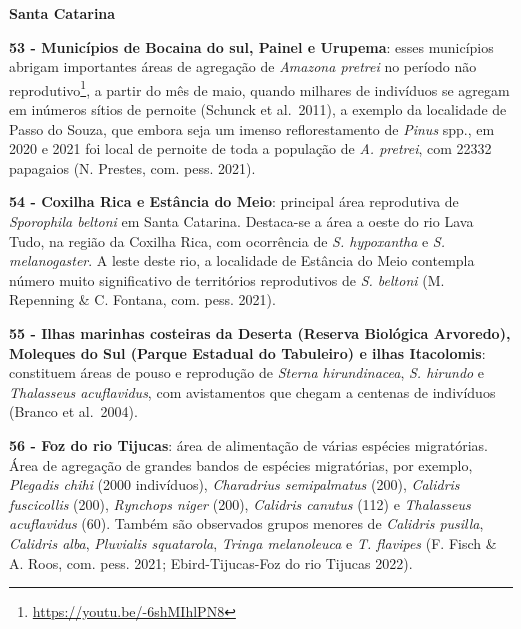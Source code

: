\documentclass[
  oneside]{scrbook}
\DeclareRobustCommand{\href}[2]{#2\footnote{\url{#1}}}
\begin{document}
\textbf{Santa Catarina}

\textbf{53 - Municípios de Bocaina do sul, Painel e Urupema}: esses municípios abrigam \href{https://youtu.be/-6shMIhlPN8}{importantes áreas de agregação de \emph{Amazona pretrei} no período não reprodutivo}, a partir do mês de maio, quando milhares de indivíduos se agregam em inúmeros sítios de pernoite (Schunck et al.~2011), a exemplo da localidade de Passo do Souza, que embora seja um imenso reflorestamento de \emph{Pinus} spp., em 2020 e 2021 foi local de pernoite de toda a população de \emph{A. pretrei}, com 22332 papagaios (N. Prestes, com. pess. 2021).

\textbf{54 - Coxilha Rica e Estância do Meio}: principal área reprodutiva de \emph{Sporophila beltoni} em Santa Catarina. Destaca-se a área a oeste do rio Lava Tudo, na região da Coxilha Rica, com ocorrência de \emph{S. hypoxantha} e \emph{S. melanogaster}. A leste deste rio, a localidade de Estância do Meio contempla número muito significativo de territórios reprodutivos de \emph{S. beltoni} (M. Repenning \& C. Fontana, com. pess. 2021).

\textbf{55 - Ilhas marinhas costeiras da Deserta (Reserva Biológica Arvoredo), Moleques do Sul (Parque Estadual do Tabuleiro) e ilhas Itacolomis}: constituem áreas de pouso e reprodução de \emph{Sterna hirundinacea}, \emph{S. hirundo} e \emph{Thalasseus acuflavidus}, com avistamentos que chegam a centenas de indivíduos (Branco et al.~2004).

\textbf{56 - Foz do rio Tijucas}: área de alimentação de várias espécies migratórias. Área de agregação de grandes bandos de espécies migratórias, por exemplo, \emph{Plegadis chihi} (2000 indivíduos), \emph{Charadrius semipalmatus} (200), \emph{Calidris fuscicollis} (200), \emph{Rynchops niger} (200), \emph{Calidris canutus} (112) e \emph{Thalasseus acuflavidus} (60). Também são observados grupos menores de \emph{Calidris pusilla}, \emph{Calidris alba}, \emph{Pluvialis squatarola}, \emph{Tringa melanoleuca} e \emph{T. flavipes} (F. Fisch \& A. Roos, com. pess. 2021; Ebird-Tijucas-Foz do rio Tijucas 2022).
\end{document}
